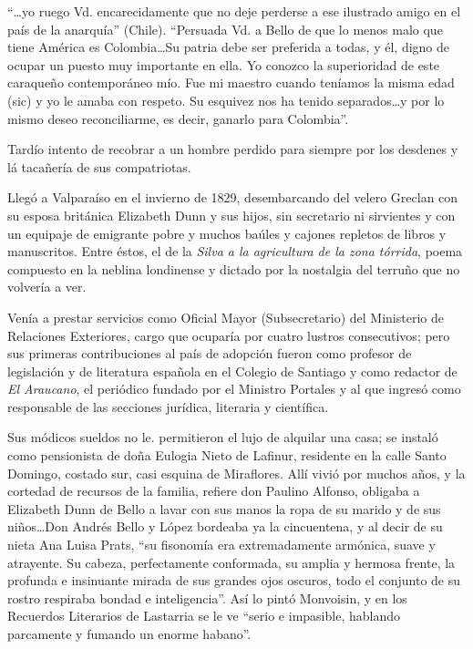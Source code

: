 \documentclass[10pt,twoside,openright]{memoir}
\begin{document}
``\ldots yo ruego Vd. encarecidamente que no deje perderse a ese ilustrado
amigo en el país de la anarquía'' (Chile). ``Persuada Vd. a Bello de que
lo menos malo que tiene América es Colombia\ldots Su patria debe ser
preferida a todas, y él, digno de ocupar un puesto muy importante en
ella. Yo conozco la superioridad de este caraqueño contemporáneo mío.
Fue mi maestro cuando teníamos la misma edad (sic) y yo le amaba con
respeto. Su esquivez nos ha tenido separados\ldots y por lo mismo deseo
reconciliarme, es decir, ganarlo para Colombia''.

Tardío intento de recobrar a un hombre perdido para siempre por los
desdenes y lá tacañería de sus compatriotas.

Llegó a Valparaíso en el invierno de 1829, desembarcando del velero
Greclan con su esposa británica Elizabeth Dunn y sus hijos, sin
secretario ni sirvientes y con un equipaje de emigrante pobre y muchos
baúles y cajones repletos de libros y manuscritos. Entre éstos, el de la
\emph{Silva a la agricultura de la zona tórrida}, poema compuesto en la
neblina londinense y dictado por la nostalgia del terruño que no
volvería a ver.

Venía a prestar servicios como Oficial Mayor (Subsecretario) del
Ministerio de Relaciones Exteriores, cargo que ocuparía por cuatro
lustros consecutivos; pero sus primeras contribuciones al país de
adopción fueron como profesor de legislación y de literatura española en
el Colegio de Santiago y como redactor de \emph{El Araucano}, el periódico
fundado por el Ministro Portales y al que ingresó como responsable de
las secciones jurídica, literaria y científica.

Sus módicos sueldos no le. permitieron el lujo de alquilar una casa; se
instaló como pensionista de doña Eulogia Nieto de Lafinur, residente en
la calle Santo Domingo, costado sur, casi esquina de Miraflores. Allí
vivió por muchos años, y la cortedad de recursos de la familia, refiere
don Paulino Alfonso, obligaba a Elizabeth Dunn de Bello a lavar con sus
manos la ropa de su marido y de sus niños\ldots Don Andrés Bello y López
bordeaba ya la cincuentena, y al decir de su nieta Ana Luisa Prats, ``su
fisonomía era extremadamente armónica, suave y atrayente. Su cabeza,
perfectamente conformada, su amplia y hermosa frente, la profunda e
insinuante mirada de sus grandes ojos oscuros, todo el conjunto de su
rostro respiraba bondad e inteligencia''. Así lo pintó Monvoisin, y en
los Recuerdos Literarios de Lastarria se le ve ``serio e impasible,
hablando parcamente y fumando un enorme habano''.
\end{document}
